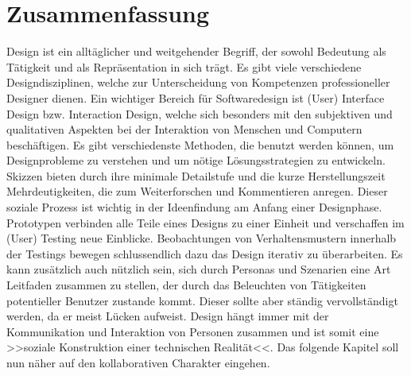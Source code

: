 \section*{Zusammenfassung}
Design ist ein alltäglicher und weitgehender Begriff, der sowohl Bedeutung als Tätigkeit und als Repräsentation in sich trägt. Es gibt viele verschiedene Designdisziplinen, welche zur Unterscheidung von Kompetenzen professioneller Designer dienen. Ein wichtiger Bereich für Softwaredesign ist (User) Interface Design bzw. Interaction Design, welche sich besonders mit den subjektiven und qualitativen Aspekten bei der Interaktion von Menschen und Computern beschäftigen. Es gibt verschiedenste Methoden, die benutzt werden können, um Designprobleme zu verstehen und um nötige Lösungsstrategien zu entwickeln. Skizzen bieten durch ihre minimale Detailstufe und die kurze Herstellungszeit Mehrdeutigkeiten, die zum Weiterforschen und Kommentieren anregen. Dieser soziale Prozess ist wichtig in der Ideenfindung am Anfang einer Designphase. Prototypen verbinden alle Teile eines Designs zu einer Einheit und verschaffen im (User) Testing neue Einblicke. Beobachtungen von Verhaltensmustern innerhalb der Testings bewegen schlussendlich dazu das Design iterativ zu überarbeiten. Es kann zusätzlich auch nützlich sein, sich durch Personas und Szenarien eine Art Leitfaden zusammen zu stellen, der durch das Beleuchten von Tätigkeiten potentieller Benutzer zustande kommt. Dieser sollte aber ständig vervollständigt werden, da er meist Lücken aufweist. %
Design hängt immer mit der Kommunikation und Interaktion von Personen zusammen und ist somit eine >>soziale Konstruktion einer technischen Realität<<. Das folgende Kapitel soll nun näher auf den kollaborativen Charakter eingehen.

